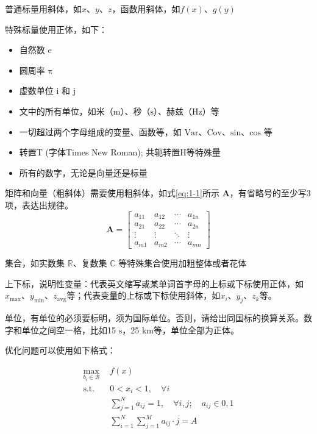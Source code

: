 普通标量用斜体，如$x$、$y$、$z$，函数用斜体，如$f(x)$、$g(y)$

特殊标量使用正体，如下：
\begin{itemize}
    \item 自然数 $\mathrm{e}$
    \item 圆周率 $\mathrm{\pi}$
    \item 虚数单位 $\mathrm{i}$ 和 $\mathrm{j}$
    \item 文中的所有单位，如米（$\mathrm{m}$）、秒（$\mathrm{s}$）、赫兹（$\mathrm{Hz}$）等
    \item 一切超过两个字母组成的变量、函数等，如 $\mathrm{Var}$、$\mathrm{Cov}$、$\mathrm{sin}$、$\mathrm{cos}$ 等
    \item 转置$\mathrm{T}$ (字体Times New Roman); 共轭转置$\mathrm{H}$等特殊量
    \item 所有的数字，无论是向量还是标量
\end{itemize}

矩阵和向量（粗斜体）需要使用粗斜体，如式\ref{eq:1-1}所示 $\boldsymbol{A}$，有省略号的至少写3项，表达出规律。
\begin{equation}
\boldsymbol{A} = \begin{bmatrix}
a_{11} & a_{12} & \cdots & a_{1n} \\
a_{21} & a_{22} & \cdots & a_{2n} \\
\vdots & \vdots & \ddots & \vdots \\
a_{m1} & a_{m2} & \cdots & a_{mn}
\end{bmatrix}
\label{eq:1-1}
\end{equation}

集合，如实数集 $\mathbb{R}$、复数集 $\mathbb{C}$ 等特殊集合使用加粗整体或者花体

上下标，说明性变量：代表英文缩写或某单词首字母的上标或下标使用正体，如$x_{\mathrm{max}}$、$y_{\mathrm{min}}$、$z_{\mathrm{avg}}$等；代表变量的上标或下标使用斜体，如$x_i$、$y_j$、$z_k$等。

单位，有单位的必须要标明，须为国际单位。否则，请给出同国标的换算关系。数字和单位之间空一格，比如15 $\mathrm{s}$，25 $\mathrm{km}$等，单位全部为正体。

优化问题可以使用如下格式：

\begin{subequations}
\label{eq:1-2}
\begin{align}
\max\limits_{b_i \in \mathcal{B}} & f(x) \label{eq:1-2-func} \\
\text{s.t.} \quad
& 0 < x_i < 1, \quad \forall i \label{eq:1-2-const1} \\
& \sum_{j=1}^N a_{ij} = 1, \quad \forall i,j; \quad a_{ij} \in {0,1} \label{eq:1-2-const2} \\
& \sum_{i=1}^N \sum_{j=1}^M a_{ij} \cdot j = A \label{eq:1-2-const3} 
\end{align}
\end{subequations}

